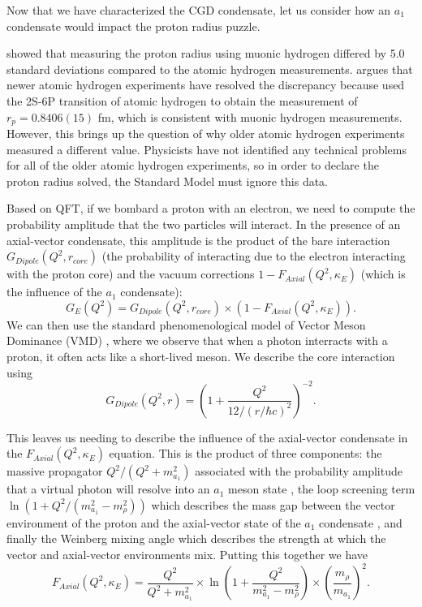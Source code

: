 Now that we have characterized the CGD condensate, let us consider how an $a_1$ condensate would impact the proton radius puzzle.

\citet{pohl2010size} showed that measuring the proton radius using muonic hydrogen differed by 5.0 standard deviations compared to the atomic hydrogen measurements. \citet{miller2026proton} argues that newer atomic hydrogen experiments have resolved the discrepancy because \citet{maisenbacher2026sub} used the 2S-6P transition of atomic hydrogen to obtain the measurement of $r_p = 0.8406(15)$ fm, which is consistent with muonic hydrogen measurements. However, this brings up the question of why older atomic hydrogen experiments measured a different value. Physicists have not identified any technical problems for all of the older atomic hydrogen experiments, so in order to declare the proton radius solved, the Standard Model must ignore this data.

Based on QFT, if we bombard a proton with an electron, we need to compute the probability amplitude that the two particles will interact. In the presence of an axial-vector condensate, this amplitude is the product of the bare interaction $G_{Dipole}(Q^2, r_{core})$ (the probability of interacting due to the electron interacting with the proton core) and the vacuum corrections $1 - F_{Axial}(Q^2, \kappa_E)$ (which is the influence of the $a_1$ condensate):
\begin{equation}
    G_E(Q^2) = G_{Dipole}(Q^2, r_{core}) \times ( 1 - F_{Axial}(Q^2, \kappa_E) ).
\end{equation}
\noindent We can then use the standard phenomenological model of Vector Meson Dominance (VMD) \citep{bodek2008vector}, where we observe that when a photon interracts with a proton, it often acts like a short-lived meson. We describe the core interaction using
\begin{equation}
    G_{Dipole}(Q^2, r) = \left( 1 + \frac{Q^2}{12 / (r / \hbar c)^2} \right)^{-2}.
\end{equation}

This leaves us needing to describe the influence of the axial-vector condensate in the $F_{Axial}(Q^2, \kappa_E)$ equation. This is the product of three components: the massive propagator $Q^2 / (Q^2 + m_{a_1}^2)$ associated with the probability amplitude that a virtual photon will resolve into an $a_1$ meson state \citep{guichon1983axial}, the loop screening term $\ln(1 + Q^2 / (m_{a_1}^2 - m_\rho^2))$ which describes the mass gap between the vector environment of the proton and the axial-vector state of the $a_1$ condensate \citep{coleman1973radiative, gross1973asymptotically}, and finally the Weinberg mixing angle \citep{weinberg1967precise} which describes the strength at which the vector and axial-vector environments mix. Putting this together we have
\begin{equation}
    F_{Axial}(Q^2, \kappa_E) = \frac{Q^2}{Q^2 + m_{a_1}^2} \times \ln\left( 1 + \frac{Q^2}{m_{a_1}^2 - m_\rho^2} \right) \times \left( \frac{m_\rho}{m_{a_1}} \right)^2 .
\end{equation}

